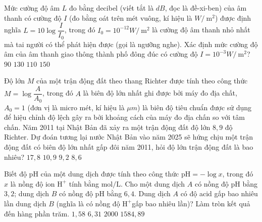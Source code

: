 \begin{ex}%
	Mức cường độ âm $L$ đo bằng decibel (viết tắt là $dB$, đọc là đề-xi-ben) của âm thanh có cường độ $I$ (đo bằng oát trên mét vuông, kí hiệu là $W/\mathrm{~m}^2$) được định nghĩa $L=10\log \dfrac{I}{I_0}$, trong đó $I_0=10^{-12} W/\mathrm{~m}^2$ là cường độ âm thanh nhỏ nhất mà tai người có thể phát hiện được (gọi là ngưỡng nghe). Xác định mức cường độ âm của âm thanh  giao thông thành phố đông đúc có cường độ $I=10^{-3} W/\mathrm{~m}^2$?
	\choice 
		{\True $90$} 
		 {$130$}
		{$110$} 
		{$150$} 
\end{ex}

\begin{ex}%
	Độ lớn $M$ của một trận động đất theo thang Richter được tính theo công thức $M=\log \dfrac{A}{A_0}$, trong đó $A$ là biên độ lớn nhất ghi được bởi máy đo địa chất, $A_0=1$ (đơn vị là micro mét, kí hiệu là $\mu m$) là biên độ tiêu chuẩn được sử dụng để hiệu chỉnh độ lệch gây ra bởi khoảng cách của máy đo địa chấn so với tâm chấn. Năm 2011 tại Nhật Bản đã xảy ra một trận động  đất độ lớn $8{,}9$ độ Richter. Dự đoán tương lại nước Nhật Bản vào năm 2025 sẽ hứng chịu một trận động đất có biên độ lớn nhất gấp đôi năm 2011, hỏi độ lớn trận động đất là bao nhiêu?
	 \choice
		{$17{,}8$} 
		 {$10{,}9$}
		{\True  $9{,}2$}
		{$8{,}6$} 
\end{ex}

\begin{ex}%
	Biết độ $\mathrm{pH}$ của một dung dịch được tính theo công thức $\mathrm{pH}=-\log x$, trong đó $x$ là nồng độ ion $\mathrm{H}^{+}$ tính bằng $\mathrm{mol}/ \mathrm{L}$. Cho một dung dịch $A$ có nồng độ $\mathrm{pH}$ bằng $3{,}2$; dung dịch $B$ có nồng độ  $\mathrm{pH}$ bằng $6{,}4$. Dung dịch $A$ có độ acid gấp bao nhiêu lần dung dịch $B$ (nghĩa là có nồng độ $\mathrm{H}^{+}$gấp bao nhiêu lần)? Làm tròn kết quả đến hàng phần trăm.
	 \choice
		{$1{,}58$} 
		{$6{,}31$} 
		{$2000$} 
		{\True $1584{,}89$} 
\end{ex}

